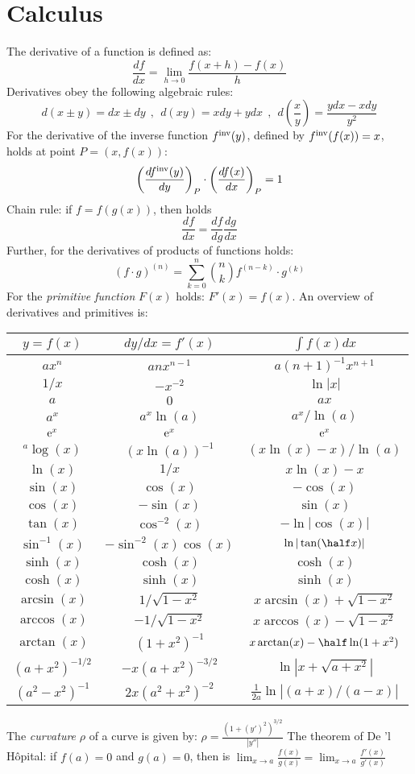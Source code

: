 \section{Calculus}
The derivative of a function is defined as:
\[
\frac{df}{dx}=\lim_{h\rightarrow0}\frac{f(x+h)-f(x)}{h}
\]
Derivatives obey the following algebraic rules:
\[
d(x\pm y)=dx\pm dy~~,~~d(xy)=xdy+ydx~~,~~d\left(\frac{x}{y}\right)=\frac{ydx-xdy}{y^2}
\]
For the derivative of the inverse function $f^{\rm inv}(y)$, defined by
$f^{\rm inv}(f(x))=x$, holds at point $P=(x,f(x))$:
\[
\left(\frac{df^{\rm inv}(y)}{dy}\right)_P\cdot\left(\frac{df(x)}{dx}\right)_P=1
\]
Chain rule: if $f=f(g(x))$, then holds
\[
\frac{df}{dx}=\frac{df}{dg}\frac{dg}{dx}
\]
Further, for the derivatives of products of functions holds:
\[
(f\cdot g)^{(n)}=\sum\limits_{k=0}^n{n\choose k}f^{(n-k)}\cdot g^{(k)}
\]
For the {\it primitive function} $F(x)$ holds: $F'(x)=f(x)$.
An overview of derivatives and primitives is:
\begin{center}
\begin{tabular}{||c|c|c||}
\hline
\boldmath$y=f(x)$\unboldmath&\boldmath$dy/dx=f'(x)$\unboldmath&\boldmath$\int f(x)dx$\rule{0pt}{12pt}\rule[-7pt]{0pt}{0pt}\unboldmath\\
\hline
\hline
$ax^n$&$anx^{n-1}$&$a(n+1)^{-1}x^{n+1}$\rule{0pt}{12pt}\\
$1/x$&$-x^{-2}$&$\ln|x|$\\
$a$&$0$&$ax$\\
\hline
$a^x$&$a^x\ln(a)$&$a^x/\ln(a)$\rule{0pt}{12pt}\\
${\rm e}^x$&${\rm e}^x$&${\rm e}^x$\\
$^a\log(x)$&$(x\ln(a))^{-1}$&$(x\ln(x)-x)/\ln(a)$\\
$\ln(x)$&$1/x$&$x\ln(x)-x$\\
\hline
$\sin(x)$&$\cos(x)$&$-\cos(x)$\\
$\cos(x)$&$-\sin(x)$&$\sin(x)$\\
$\tan(x)$&$\cos^{-2}(x)$&$-\ln|\cos(x)|$\\
$\sin^{-1}(x)$&$-\sin^{-2}(x)\cos(x)$&$\ln|\tan(\half x)|$\\
$\sinh(x)$&$\cosh(x)$&$\cosh(x)$\\
$\cosh(x)$&$\sinh(x)$&$\sinh(x)$\\
$\arcsin(x)$&$1/\sqrt{1-x^2}$&$x\arcsin(x)+\sqrt{1-x^2}$\\
$\arccos(x)$&$-1/\sqrt{1-x^2}$&$x\arccos(x)-\sqrt{1-x^2}$\\
$\arctan(x)$&$(1+x^2)^{-1}$&$x\arctan(x)-\half\ln(1+x^2)$\rule[-7pt]{0pt}{0pt}\\
\hline
$(a+x^2)^{-1/2}$&$-x(a+x^2)^{-3/2}$&$\ln|x+\sqrt{a+x^2}|$\rule{0pt}{12pt}\\
$(a^2-x^2)^{-1}$&$2x(a^2+x^2)^{-2}$&$\displaystyle\frac{1}{2a}\ln|(a+x)/(a-x)|$\rule[-10pt]{0pt}{23pt}\\
\hline
\end{tabular}
\end{center}
The {\it curvature} $\rho$ of a curve is given by:
$\displaystyle\rho=\frac{(1+(y')^2)^{3/2}}{|y''|}$
\npar
The theorem of De 'l H\^opital: if $f(a)=0$ and $g(a)=0$, then is
$\displaystyle\lim_{x\rightarrow a}\frac{f(x)}{g(x)}=\lim_{x\rightarrow a}\frac{f'(x)}{g'(x)}$

